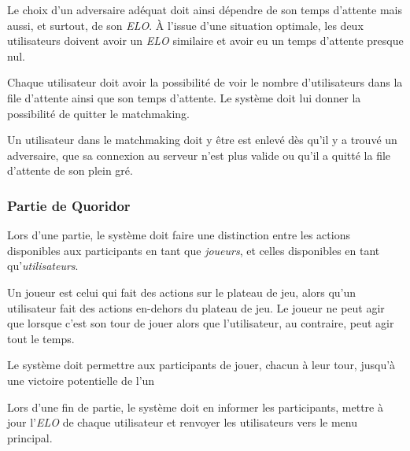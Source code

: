 Le choix d'un adversaire adéquat doit ainsi dépendre de son temps
d'attente mais aussi, et surtout, de son \emph{ELO}.
À l'issue d'une situation optimale, les deux utilisateurs doivent
avoir un \emph{ELO} similaire et avoir eu un temps d'attente presque
nul.

Chaque utilisateur doit avoir la possibilité de voir le nombre d'utilisateurs
dans la file d'attente ainsi que son temps d'attente. Le
système doit lui donner la possibilité de quitter le
matchmaking.

Un utilisateur dans le matchmaking doit y être est enlevé
dès qu'il y a trouvé un adversaire, que sa connexion au
serveur n'est plus valide ou qu'il a quitté la file
d'attente de son plein gré.

\subsubsection{Partie de Quoridor}

Lors d'une partie, le système doit faire une distinction
entre les actions disponibles aux participants en tant que
\emph{joueurs}, et
celles disponibles en tant qu'\emph{utilisateurs}.

Un joueur est celui qui fait des actions sur le
plateau de jeu, alors qu'un utilisateur fait des
actions en-dehors du plateau de jeu. Le joueur ne peut agir
que lorsque c'est son tour de jouer alors que l'utilisateur, au
contraire, peut agir tout le temps.

Le système doit permettre aux participants de jouer,
chacun à leur tour, jusqu'à une victoire potentielle
de l'un

Lors d'une fin de partie, le système doit en informer les
participants, mettre à jour l'\emph{ELO} de chaque
utilisateur et renvoyer les utilisateurs vers le menu principal.





